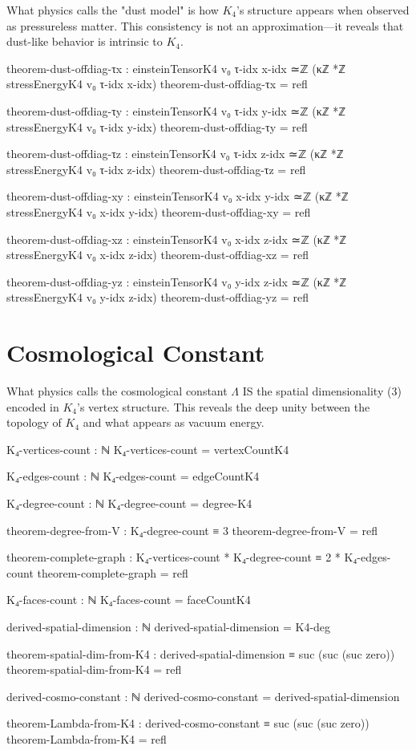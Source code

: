 \documentclass[11pt,a4paper]{book}
\begin{document}
What physics calls the "dust model" is how $K_4$'s structure appears when observed as pressureless matter. This consistency is not an approximation—it reveals that dust-like behavior is intrinsic to $K_4$.

\begin{code}
theorem-dust-offdiag-τx : einsteinTensorK4 v₀ τ-idx x-idx ≃ℤ (κℤ *ℤ stressEnergyK4 v₀ τ-idx x-idx)
theorem-dust-offdiag-τx = refl

theorem-dust-offdiag-τy : einsteinTensorK4 v₀ τ-idx y-idx ≃ℤ (κℤ *ℤ stressEnergyK4 v₀ τ-idx y-idx)
theorem-dust-offdiag-τy = refl

theorem-dust-offdiag-τz : einsteinTensorK4 v₀ τ-idx z-idx ≃ℤ (κℤ *ℤ stressEnergyK4 v₀ τ-idx z-idx)
theorem-dust-offdiag-τz = refl

theorem-dust-offdiag-xy : einsteinTensorK4 v₀ x-idx y-idx ≃ℤ (κℤ *ℤ stressEnergyK4 v₀ x-idx y-idx)
theorem-dust-offdiag-xy = refl

theorem-dust-offdiag-xz : einsteinTensorK4 v₀ x-idx z-idx ≃ℤ (κℤ *ℤ stressEnergyK4 v₀ x-idx z-idx)
theorem-dust-offdiag-xz = refl

theorem-dust-offdiag-yz : einsteinTensorK4 v₀ y-idx z-idx ≃ℤ (κℤ *ℤ stressEnergyK4 v₀ y-idx z-idx)
theorem-dust-offdiag-yz = refl
\end{code}

\section{Cosmological Constant}

What physics calls the cosmological constant $\Lambda$ IS the spatial dimensionality (3) encoded in $K_4$'s vertex structure. This reveals the deep unity between the topology of $K_4$ and what appears as vacuum energy.

\begin{code}
K₄-vertices-count : ℕ
K₄-vertices-count = vertexCountK4

K₄-edges-count : ℕ
K₄-edges-count = edgeCountK4

K₄-degree-count : ℕ
K₄-degree-count = degree-K4

theorem-degree-from-V : K₄-degree-count ≡ 3
theorem-degree-from-V = refl

theorem-complete-graph : K₄-vertices-count * K₄-degree-count ≡ 2 * K₄-edges-count
theorem-complete-graph = refl

K₄-faces-count : ℕ
K₄-faces-count = faceCountK4

derived-spatial-dimension : ℕ
derived-spatial-dimension = K4-deg

theorem-spatial-dim-from-K4 : derived-spatial-dimension ≡ suc (suc (suc zero))
theorem-spatial-dim-from-K4 = refl

derived-cosmo-constant : ℕ
derived-cosmo-constant = derived-spatial-dimension

theorem-Lambda-from-K4 : derived-cosmo-constant ≡ suc (suc (suc zero))
theorem-Lambda-from-K4 = refl
\end{code}
\end{document}
